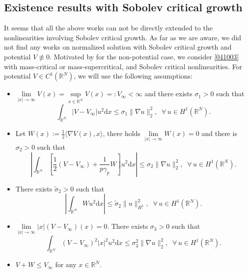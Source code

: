 \documentclass[10pt]{article}
\numberwithin{equation}{section}
\newcommand{\ud}{\mathrm{d}}
\numberwithin{equation}{section}
\begin{document}
\subsection{Existence results with Sobolev critical growth}
 It seems that all the above works can not be directly extended to the nonlinearities involving Sobolev critical growth. As far as we are aware, we did not find any works on normalized solution with Sobolev critical growth and potential $V \not\equiv 0$. Motivated by \cite{ WW22, Soave20_JFA} for the non-potential case, we consider \eqref{041003} with mass-critical or mass-supercritical, and Sobolev critical nonlinearities. For potential $V\in C^1(\mathbb{R}^N)$, we will use the following assumptions:
\begin{itemize}
\item [$(V_1)$]  $\lim\limits_{|x|\rightarrow\infty} V(x)=\underset{x\in  \mathbb{R}^N}{\sup} V(x)=:V_{\infty}<\infty$ and there exists $\sigma_1> 0$ such that
\begin{equation}\label{2301262110}
    \int_{\mathbb{R}^N}\left|V-V_\infty\right|u^2 \ud x\le \sigma_1\|\nabla u\|^2_2, \;\; \forall\, u \in H^1(\mathbb{R}^N).
\end{equation}
\item[$(V_2)$] Let $W(x):=\frac12 \langle \nabla V(x),x\rangle$, there holds $\lim\limits_{|x|\rightarrow\infty} W(x)=0$ and there is $\sigma_2> 0$ such that
\begin{equation}
    \left|\int_{\mathbb{R}^N}  \left[\frac12 (V-V_{\infty})+\frac{1}{p\gamma_p} W\right] u^2 \ud x\right|\le \sigma_2\|\nabla u\|^2_2, \;\;\forall\, u \in H^1(\mathbb{R}^N).
\end{equation}
\item[$(\widetilde{V}_2)$] There exists $\widetilde{\sigma}_2> 0$ such that
\begin{equation}\label{2301271518}
    \left|\int_{\mathbb{R}^N}Wu^2 \ud x\right|\le \widetilde{\sigma}_2\|u\|^2_{H^1}, \;\;\forall\, u \in H^1(\mathbb{R}^N).
\end{equation}
\item[$(V_3)$] $\underset{|x|\to \infty}{\lim}|x|(V-V_{\infty})(x)=0$. There exists ${\sigma_3}>0$ such that
\begin{equation}\label{2301271916}
     \int_{\mathbb{R}^N} \left(V-V_{\infty}\right)^2|x|^2u^2  \ud x\le {\sigma_3^2}\|\nabla u\|^2_2, \;\;\forall\, u \in H^1(\mathbb{R}^N).
\end{equation}
\item[$(V_4)$] $V+W\le V_{\infty}$ for any $x\in\mathbb{R}^N.$
\end{itemize}
\end{document}
